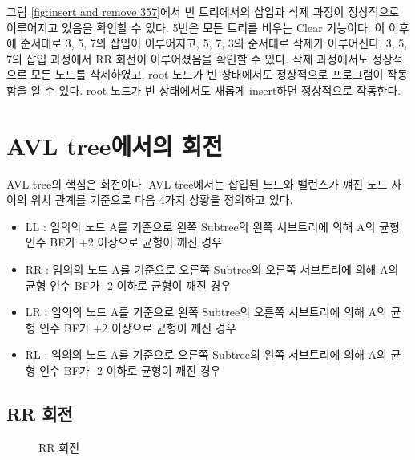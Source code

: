 \documentclass{article}
\begin{document}
그림 \ref{fig:insert and remove 357}에서 빈 트리에서의 삽입과 삭제 과정이 정상적으로 이루어지고 있음을 확인할 수 있다. 5번은 모든 트리를 비우는 Clear 기능이다. 이 이후에 순서대로 3, 5, 7의 삽입이 이루어지고, 5, 7, 3의 순서대로 삭제가 이루어진다. 3, 5, 7의 삽입 과정에서 RR 회전이 이루어졌음을 확인할 수 있다. 삭제 과정에서도 정상적으로 모든 노드를 삭제하였고, root 노드가 빈 상태에서도 정상적으로 프로그램이 작동함을 알 수 있다. root 노드가 빈 상태에서도 새롭게 insert하면 정상적으로 작동한다.

\section{AVL tree에서의 회전}
AVL tree의 핵심은 회전이다. AVL tree에서는 삽입된 노드와 밸런스가 꺠진 노드 사이의 위치 관계를 기준으로 다음 4가지 상황을 정의하고 있다.
\begin{itemize}
    \item LL : 임의의 노드 A를 기준으로 왼쪽 Subtree의 왼쪽 서브트리에 의해 A의 균형 인수 BF가 +2 이상으로 균형이 깨진 경우
    \item RR : 임의의 노드 A를 기준으로 오른쪽 Subtree의 오른쪽 서브트리에 의해 A의 균형 인수 BF가 -2 이하로 균형이 깨진 경우
    \item LR : 임의의 노드 A를 기준으로 왼쪽 Subtree의 오른쪽 서브트리에 의해 A의 균형 인수 BF가 +2 이상으로 균형이 깨진 경우
    \item RL : 임의의 노드 A를 기준으로 오른쪽 Subtree의 왼쪽 서브트리에 의해 A의 균형 인수 BF가 -2 이하로 균형이 깨진 경우
\end{itemize}

\subsection{RR 회전}
\begin{figure}
    \centering
    \caption{RR 회전}
    \label{fig:RR rotation}
\end{figure}
\end{document}
